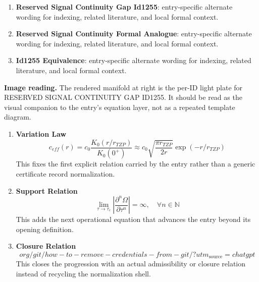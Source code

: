 \begin{enumerate}[leftmargin=1.6em,itemsep=6pt,topsep=4pt]
\item \textbf{Reserved Signal Continuity Gap Id1255}: entry-specific alternate wording for indexing, related literature, and local formal context.
\item \textbf{Reserved Signal Continuity Formal Analogue}: entry-specific alternate wording for indexing, related literature, and local formal context.
\item \textbf{Id1255 Equivalence}: entry-specific alternate wording for indexing, related literature, and local formal context.
\end{enumerate}

\begin{samepage}
\noindent\begin{minipage}[t]{0.45\linewidth}
\vspace{0pt}
\raggedright
\scriptsize\textbf{Image reading.} The rendered manifold at right is the per-ID light plate for RESERVED SIGNAL CONTINUITY GAP ID1255. It should be read as the visual companion to the entry's equation layer, not as a repeated template diagram.\par
\end{minipage}\hfill
\begin{minipage}[t]{0.53\linewidth}
\vspace*{-0.10in}
\raggedright
{}
\end{minipage}
\end{samepage}

\clearpage


\begin{enumerate}[leftmargin=1.6em,itemsep=9pt,topsep=6pt]
\item \textbf{Variation Law}
\[
c_{eff}(r) = c_0 \frac{K_0(r/r_{TZP})}{K_0(0^+)} \approx c_0 \sqrt{\frac{\pi r_{TZP}}{2r}} \exp(-r/r_{TZP})
\]
This fixes the first explicit relation carried by the entry rather than a generic certificate record normalization.

\item \textbf{Support Relation}
\[
\lim_{\tau \to \tau_c} \left| \frac{\partial^n \Omega}{\partial \tau^n} \right| = \infty, \quad \forall n \in \mathbb{N}
\]
This adds the next operational equation that advances the entry beyond its opening definition.

\item \textbf{Closure Relation}
\[
org/git/how-to-remove-credentials-from-git/?utm_{\mathrm{source}}=chatgpt
\]
This closes the progression with an actual admissibility or closure relation instead of recycling the normalization shell.
\end{enumerate}

